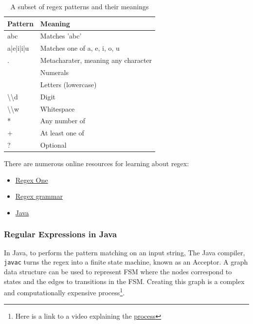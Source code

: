 \documentclass[
]{book}
\providecommand{\tightlist}{%
  \setlength{\itemsep}{0pt}\setlength{\parskip}{0pt}}
\begin{document}
\begin{table}

\caption{\label{tab:regex-patterns}A subset of regex patterns and their meanings}
\centering
\begin{tabular}[t]{ll}
\toprule
Pattern & Meaning\\
\midrule
abc & Matches 'abc'\\
a|e|i|i|u & Matches one of a, e, i, o, u\\
. & Metacharater, meaning any character\\
[0-9] & Numerals\\
[a-z] & Letters (lowercase)\\
\addlinespace
\textbackslash{}\textbackslash{}d & Digit\\
\textbackslash{}\textbackslash{}w & Whitespace\\
* & Any number of\\
+ & At least one of\\
? & Optional\\
\bottomrule
\end{tabular}
\end{table}

There are numerous online resources for learning about regex:

\begin{itemize}
\tightlist
\item
  \href{https://regexone.com/}{Regex One}
\item
  \href{http://web.mit.edu/6.005/www/fa16/classes/17-regex-grammars/}{Regex grammar}
\item
  \href{https://regexone.com/references/java}{Java}
\end{itemize}

\hypertarget{regular-expressions-in-java}{%
\subsubsection{Regular Expressions in Java}\label{regular-expressions-in-java}}

In Java, to perform the pattern matching on an input string, The Java compiler, \texttt{javac} turns the regex into a finite state machine, known as an Acceptor. A graph data structure can be used to represent FSM where the nodes correspond to states and the edges to transitions in the FSM. Creating this graph is a complex and computationally expensive process\footnote{Here is a link to a video explaining the \href{https://www.youtube.com/watch?v=GwsU2LPs85U}{process}}.
\end{document}
